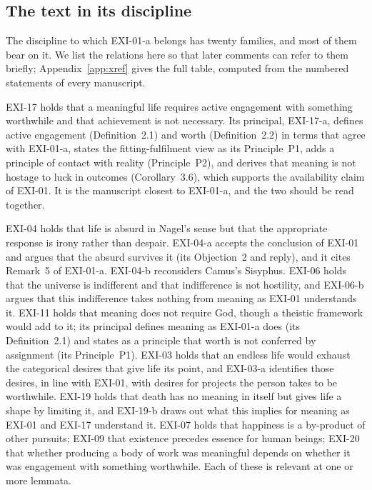 \subsection{The text in its discipline}

The discipline to which EXI-01-a belongs has twenty families, and most of them bear on it. We list the relations here so that later comments can refer to them briefly; Appendix~\ref{app:xref} gives the full table, computed from the numbered statements of every manuscript.

EXI-17 holds that a meaningful life requires active engagement with something worthwhile and that achievement is not necessary. Its principal, EXI-17-a, defines active engagement (Definition~2.1) and worth (Definition~2.2) in terms that agree with EXI-01-a, states the fitting-fulfilment view as its Principle~P1, adds a principle of contact with reality (Principle~P2), and derives that meaning is not hostage to luck in outcomes (Corollary~3.6), which supports the availability claim of EXI-01. It is the manuscript closest to EXI-01-a, and the two should be read together.

EXI-04 holds that life is absurd in Nagel's sense but that the appropriate response is irony rather than despair. EXI-04-a accepts the conclusion of EXI-01 and argues that the absurd survives it (its Objection~2 and reply), and it cites Remark~5 of EXI-01-a. EXI-04-b reconsiders Camus's Sisyphus. EXI-06 holds that the universe is indifferent and that indifference is not hostility, and EXI-06-b argues that this indifference takes nothing from meaning as EXI-01 understands it. EXI-11 holds that meaning does not require God, though a theistic framework would add to it; its principal defines meaning as EXI-01-a does (its Definition~2.1) and states as a principle that worth is not conferred by assignment (its Principle~P1). EXI-03 holds that an endless life would exhaust the categorical desires that give life its point, and EXI-03-a identifies those desires, in line with EXI-01, with desires for projects the person takes to be worthwhile. EXI-19 holds that death has no meaning in itself but gives life a shape by limiting it, and EXI-19-b draws out what this implies for meaning as EXI-01 and EXI-17 understand it. EXI-07 holds that happiness is a by-product of other pursuits; EXI-09 that existence precedes essence for human beings; EXI-20 that whether producing a body of work was meaningful depends on whether it was engagement with something worthwhile. Each of these is relevant at one or more lemmata.

